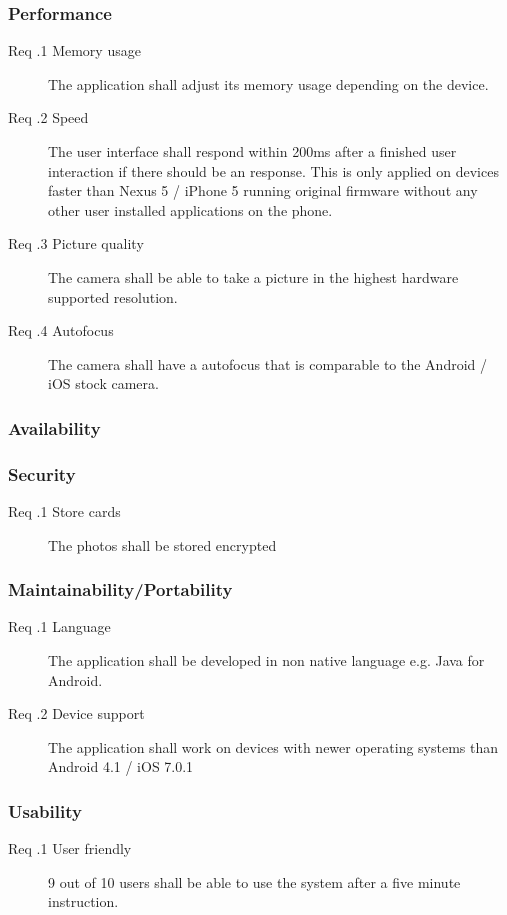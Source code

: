 \documentclass[10pt,a4paper]{article}
\newcommand{\tsss}{\thesubsubsection}
\begin{document}
\subsubsection{Performance}
\begin{description}
	\item[Req \tsss.1 Memory usage] The application shall adjust its memory usage depending on the device.
	\item[Req \tsss.2 Speed] The user interface shall respond within 200ms after a finished user interaction if there should be an response. This is only applied on devices faster than Nexus 5 / iPhone 5 running original firmware without any other user installed applications on the phone.
	\item[Req \tsss.3 Picture quality] The camera shall be able to take a picture in the highest hardware supported resolution. 
	\item[Req \tsss.4 Autofocus] The camera shall have a autofocus that is comparable to the Android / iOS stock camera. 
\end{description}
\subsubsection{Availability}
\subsubsection{Security}
\begin{description}
	\item[Req \tsss.1 Store cards] The photos shall be stored encrypted
\end{description}
\subsubsection{Maintainability/Portability}
\begin{description}
	\item[Req \tsss.1 Language] The application shall be developed in non native language e.g. Java for Android. 
	\item[Req \tsss.2 Device support] The application shall work on devices with newer operating systems than Android 4.1 / iOS 7.0.1
\end{description}
\subsubsection{Usability}
\begin{description}
	\item [Req \tsss.1 User friendly] 9 out of 10 users shall be able to use the system after a five minute instruction.
\end{description}
\end{document}
